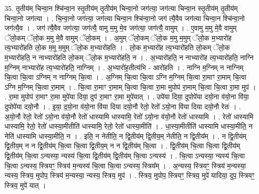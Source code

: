 \documentclass[17pt]{extarticle}
\begin{document}
35. तृ॒तीय॑म् चिन्वा॒न श्चि॑न्वा॒न स्तृ॒तीय॑म् तृ॒तीय॑म् चिन्वा॒नो जग॑त्या॒ जग॑त्या चिन्वा॒न स्तृ॒तीय॑म् तृ॒तीय॑म् चिन्वा॒नो जग॑त्या । . चि॒न्वा॒नो जग॑त्या॒ जग॑त्या चिन्वा॒न श्चि॑न्वा॒नो जग॑ त्यै॒वैव जग॑त्या चिन्वा॒न श्चि॑न्वा॒नो जग॑त्यै॒व । . जग॑ त्यै॒वैव जग॑त्या॒ जग॑त्यै॒ वामु म॒मु मे॒व जग॑त्या॒ जग॑त्यै॒ वामुम् । . ए॒वामु म॒मु मे॒वै वामुम् ॅलो॒कम् ॅलो॒क म॒मु मे॒वै वामुम् ॅलो॒कम् । . अ॒मुम् ॅलो॒कम् ॅलो॒क म॒मु म॒मुम् ॅलो॒क म॒भ्यारो॑ह त्य॒भ्यारो॑हति लो॒क म॒मु म॒मुम् ॅलो॒क म॒भ्यारो॑हति । . लो॒क म॒भ्यारो॑ह त्य॒भ्यारो॑हति लो॒कम् ॅलो॒क म॒भ्यारो॑हति॒ न नाभ्यारो॑हति लो॒कम् ॅलो॒क म॒भ्यारो॑हति॒ न । . अ॒भ्यारो॑हति॒ न नाभ्यारो॑ह त्य॒भ्यारो॑हति॒ नाग्नि म॒ग्निम् नाभ्यारो॑ह त्य॒भ्यारो॑हति॒ नाग्निम् । . अ॒भ्यारो॑ह॒तीत्य॑भि - आरो॑हति । . नाग्नि म॒ग्निम् न नाग्निम् चि॒त्वा चि॒त्वा ऽग्निम् न नाग्निम् चि॒त्वा । . अ॒ग्निम् चि॒त्वा चि॒त्वा ऽग्नि म॒ग्निम् चि॒त्वा रा॒माꣳ रा॒माम् चि॒त्वा ऽग्नि म॒ग्निम् चि॒त्वा रा॒माम् । . चि॒त्वा रा॒माꣳ रा॒माम् चि॒त्वा चि॒त्वा रा॒मा मुपोप॑ रा॒माम् चि॒त्वा चि॒त्वा रा॒मा मुप॑ । . रा॒मा मुपोप॑ रा॒माꣳ रा॒मा मुपे॑या दिया॒ दुप॑ रा॒माꣳ रा॒मा मुपे॑यात् । . उपे॑या दिया॒ दुपोपे॑या दयो॒ना व॑यो॒ना वि॑या॒ दुपोपे॑या दयो॒नौ । . इ॒या॒ द॒यो॒ना व॑यो॒ना वि॑या दिया दयो॒नौ रेतो॒ रेतो॑ ऽयो॒ना वि॑या दिया दयो॒नौ रेतः॑ । . अ॒यो॒नौ रेतो॒ रेतो॑ ऽयो॒ना व॑यो॒नौ रेतो॑ धास्यामि धास्यामि॒ रेतो॑ ऽयो॒ना व॑यो॒नौ रेतो॑ धास्यामि । . रेतो॑ धास्यामि धास्यामि॒ रेतो॒ रेतो॑ धास्या॒मीतीति॑ धास्यामि॒ रेतो॒ रेतो॑ धास्या॒मीति॑ । . धा॒स्या॒मीतीति॑ धास्यामि धास्या॒मीति॒ न नेति॑ धास्यामि धास्या॒मीति॒ न । . इति॒ न नेतीति॒ न द्वि॒तीय॑म् द्वि॒तीय॒म् नेतीति॒ न द्वि॒तीय᳚म् । . न द्वि॒तीय॑म् द्वि॒तीय॒म् न न द्वि॒तीय॑म् चि॒त्वा चि॒त्वा द्वि॒तीय॒म् न न द्वि॒तीय॑म् चि॒त्वा । . द्वि॒तीय॑म् चि॒त्वा चि॒त्वा द्वि॒तीय॑म् द्वि॒तीय॑म् चि॒त्वा ऽन्यस्या॒ न्यस्य॑ चि॒त्वा द्वि॒तीय॑म् द्वि॒तीय॑म् चि॒त्वा ऽन्यस्य॑ । . चि॒त्वा ऽन्यस्या॒ न्यस्य॑ चि॒त्वा चि॒त्वा ऽन्यस्य॒ स्त्रियꣳ॒॒ स्त्रिय॑ म॒न्यस्य॑ चि॒त्वा चि॒त्वा ऽन्यस्य॒ स्त्रिय᳚म् । . अ॒न्यस्य॒ स्त्रियꣳ॒॒ स्त्रिय॑ म॒न्यस्या॒ न्यस्य॒ स्त्रिय॒ मुपोप॒ स्त्रिय॑ म॒न्यस्या॒ न्यस्य॒ स्त्रिय॒ मुप॑ । . स्त्रिय॒ मुपोप॒ स्त्रियꣳ॒॒ स्त्रिय॒ मुपे॑ यादिया॒ दुप॒ स्त्रियꣳ॒॒ स्त्रिय॒ मुपे॑ यात् । \newline
\pagebreak
{}
\end{document}
